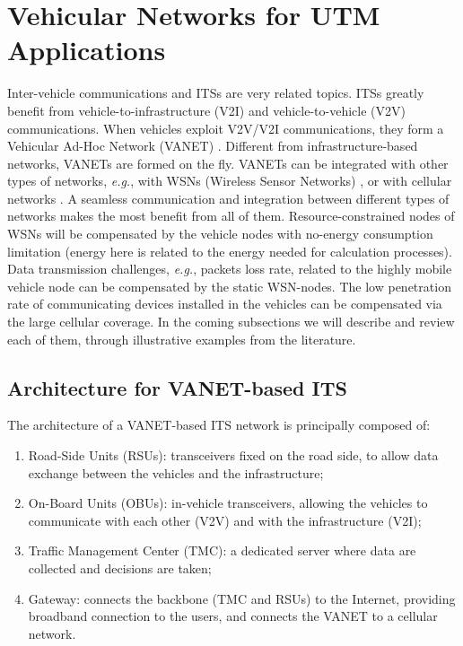 \documentclass[10pt,onecolumn]{article}
\begin{document}
\section{Vehicular Networks for UTM Applications} 
\label{vanet}

Inter-vehicle communications and ITSs are very related topics. ITSs greatly benefit from vehicle-to-infrastructure (V2I) and vehicle-to-vehicle (V2V) communications. 
When vehicles exploit V2V/V2I communications, they form a Vehicular Ad-Hoc Network (VANET) \cite{VANET}. Different from infrastructure-based networks, VANETs are formed on the fly. 
VANETs can be integrated with other types of networks, \textit{e.g.}, with WSNs (Wireless Sensor Networks) \cite{Barba2010}, or with cellular networks \cite{VanetCellular}. A seamless communication and integration between different types of networks makes the most benefit from all of them. Resource-constrained nodes of WSNs will be compensated by the vehicle nodes with no-energy consumption limitation (energy here is related to the energy needed for calculation processes). Data transmission challenges, \textit{e.g.}, packets loss rate, related to the highly mobile vehicle node can be compensated by the static WSN-nodes.  
The low penetration rate of communicating devices installed in the vehicles can be compensated via the large cellular coverage. 
In the coming subsections we will describe and review each of them, through illustrative examples from the literature.


\subsection{Architecture for VANET-based ITS}

The architecture of a VANET-based ITS network is principally composed of:

\begin{enumerate}
\item Road-Side Units (RSUs): transceivers fixed on the road side, to allow data exchange between the vehicles and the infrastructure;
\item On-Board Units (OBUs): in-vehicle transceivers, allowing the vehicles to communicate with each other (V2V) and with the infrastructure (V2I);
\item Traffic Management Center (TMC): a dedicated server where data are collected and decisions are taken;
\item Gateway: connects the backbone (TMC and RSUs) to the Internet, providing broadband connection to the users, and connects the VANET to a cellular network.
\end{enumerate}
\end{document}
